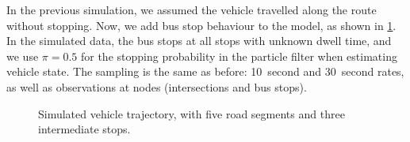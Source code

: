In the previous simulation, we assumed the vehicle travelled along the route without stopping. Now, we add bus stop behaviour to the model, as shown in \cref{fig:sim2_graph}. In the simulated data, the bus stops at all stops with unknown dwell time, and we use $\pi=0.5$ for the stopping probability in the particle filter when estimating vehicle state. The sampling is the same as before: 10~second and 30~second rates, as well as observations at nodes (intersections and bus stops).






\begin{knitrout}\small
{}\color{fgcolor}\begin{figure}
\newline
{}
\caption[Simulated vehicle trajectory, with five road segments and three intermediate stops]{Simulated vehicle trajectory, with five road segments and three intermediate stops.}\label{fig:sim2_graph}
\end{figure}


\end{knitrout}


